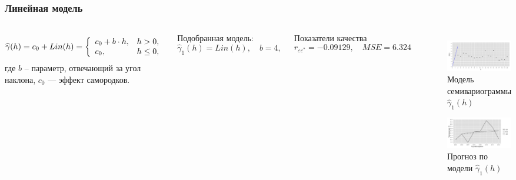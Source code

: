 \documentclass[10pt,pdf,aspectratio=169,hyperref={unicode}]{beamer}
\begin{document}
\begin{frame}
  \frametitle{Линейная модель}
  \begin{columns}[c]
  \column{3in}
  \begin{equation}\begin{gathered}
  \label{eq:lin}
    \widehat{\gamma}(h) = c_0 + Lin(h) = \left\{
   \begin{array}{l l}
     c_0 + b \cdot h, & h > 0, \\
     c_0, & h \leq 0,
   \end{array} \right.
  \end{gathered}\end{equation}
  где $ b $ -- параметр, отвечающий за угол наклона, $ c_0 $ --- эффект самородков.

  \vspace{0.5em}

  Подобранная модель:
  \begin{equation}
  \label{eq:gamma1}
    \widehat{\gamma}_1(h) = Lin(h), \quad b = 4,
  \end{equation}

  Показатели качества
  \begin{equation*}
    r_{\varepsilon\varepsilon^{*}} = -0.09129, \quad MSE = 6.324
  \end{equation*}

  \column{3in}
  \vspace{-14.5pt}
  \begin{figure}[H]
    \includegraphics[width=0.9\linewidth]{../../figures/variogram/lin-modeled.png} \\
    \caption{Модель семивариограммы $\widehat{\gamma}_1(h)$}
    \includegraphics[width=0.9\linewidth]{../../figures/variogram/lin-cross-prediction.png}
    \caption{Прогноз по модели $\widehat{\gamma}_1(h)$}
  \end{figure}
  \end{columns}
\end{frame}
\end{document}
